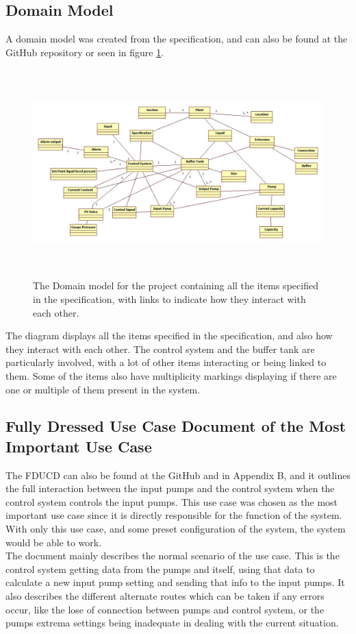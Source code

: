 \documentclass[11pt, A4paper, english]{article}
\begin{document}
		\subsection{Domain Model}
A domain model was created from the specification, and can also be found at the GitHub repository or seen in figure \ref{im:DM}.
			\begin{figure}[H]
\includegraphics[width=12.8cm, height=8cm]{Domain Model.jpg}
\caption{The Domain model for the project containing all the items specified in the specification, with links to indicate how they interact with each other.}
\label{im:DM}
			\end{figure}
The diagram displays all the items specified in the specification, and also how they interact with each other. The control system and the buffer tank are particularly involved, with a lot of other items interacting or being linked to them. Some of the items also have multiplicity markings displaying if there are one or multiple of them present in the system.

		\subsection{Fully Dressed Use Case Document of the Most Important Use Case}
The FDUCD can also be found at the GitHub and in Appendix B, and it outlines the full interaction between the input pumps and the control system when the control system controls the input pumps. This use case was chosen as the most important use case since it is directly responsible for the function of the system. With only this use case, and some preset configuration of the system, the system would be able to work. \\
The document mainly describes the normal scenario of the use case. This is the control system getting data from the pumps and itself, using that data to calculate a new input pump setting and sending that info to the input pumps. It also describes the different alternate routes which can be taken if any errors occur, like the lose of connection between pumps and control system, or the pumps extrema settings being inadequate in dealing with the current situation. 
		
\end{document}
